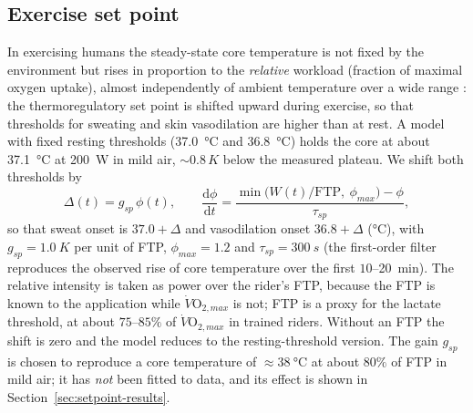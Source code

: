 \documentclass[11pt,a4paper]{article}
\newcommand{\dd}{\mathrm{d}}
\begin{document}
\subsection{Exercise set point}
\label{sec:setpoint}
In exercising humans the steady-state core temperature is not fixed by the environment but rises in proportion to the \emph{relative} workload (fraction of maximal oxygen uptake), almost independently of ambient temperature over a wide range \citep{saltin1966}: the thermoregulatory set point is shifted upward during exercise, so that thresholds for sweating and skin vasodilation are higher than at rest. A model with fixed resting thresholds (\SI{37.0}{\degreeCelsius} and \SI{36.8}{\degreeCelsius}) holds the core at about \SI{37.1}{\degreeCelsius} at \SI{200}{W} in mild air, \(\sim0.8\,\si{K}\) below the measured plateau. We shift both thresholds by
\begin{equation}
 \Delta(t)=g_{sp}\,\phi(t),\qquad
 \frac{\dd\phi}{\dd t}=\frac{\min\!\bigl(W(t)/\mathrm{FTP},\ \phi_{max}\bigr)-\phi}{\tau_{sp}},
 \label{eq:setpoint}
\end{equation}
so that sweat onset is \(37.0+\Delta\) and vasodilation onset \(36.8+\Delta\) (\si{\degreeCelsius}), with \(g_{sp}=\SI{1.0}{K}\) per unit of FTP, \(\phi_{max}=1.2\) and \(\tau_{sp}=\SI{300}{s}\) (the first-order filter reproduces the observed rise of core temperature over the first \(10\)--\SI{20}{min}). The relative intensity is taken as power over the rider's FTP, because the FTP is known to the application while \(\dot V\mathrm{O}_{2,max}\) is not; FTP is a proxy for the lactate threshold, at about \(75\)--\(85\%\) of \(\dot V\mathrm{O}_{2,max}\) in trained riders. Without an FTP the shift is zero and the model reduces to the resting-threshold version. The gain \(g_{sp}\) is chosen to reproduce a core temperature of \(\approx\SI{38}{\degreeCelsius}\) at about \(80\%\) of FTP in mild air; it has \emph{not} been fitted to data, and its effect is shown in Section~\ref{sec:setpoint-results}.
\end{document}
